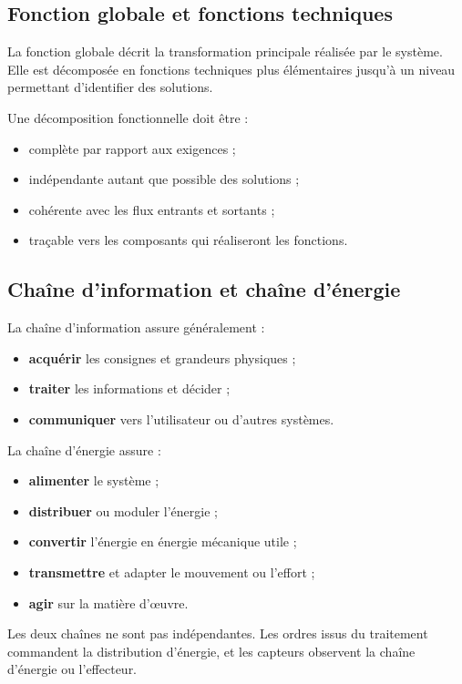 \subsection{Fonction globale et fonctions techniques}

La fonction globale décrit la transformation principale réalisée par le système. Elle est décomposée en fonctions techniques plus élémentaires jusqu'à un niveau permettant d'identifier des solutions.

Une décomposition fonctionnelle doit être :
\begin{itemize}
  \item complète par rapport aux exigences ;
  \item indépendante autant que possible des solutions ;
  \item cohérente avec les flux entrants et sortants ;
  \item traçable vers les composants qui réaliseront les fonctions.
\end{itemize}

\subsection{Chaîne d'information et chaîne d'énergie}

\ISChaineFonctionnelle

La chaîne d'information assure généralement :
\begin{itemize}
  \item \textbf{acquérir} les consignes et grandeurs physiques ;
  \item \textbf{traiter} les informations et décider ;
  \item \textbf{communiquer} vers l'utilisateur ou d'autres systèmes.
\end{itemize}

La chaîne d'énergie assure :
\begin{itemize}
  \item \textbf{alimenter} le système ;
  \item \textbf{distribuer} ou moduler l'énergie ;
  \item \textbf{convertir} l'énergie en énergie mécanique utile ;
  \item \textbf{transmettre} et adapter le mouvement ou l'effort ;
  \item \textbf{agir} sur la matière d'œuvre.
\end{itemize}

\begin{ISattention}
Les deux chaînes ne sont pas indépendantes. Les ordres issus du traitement commandent la distribution d'énergie, et les capteurs observent la chaîne d'énergie ou l'effecteur.
\end{ISattention}

